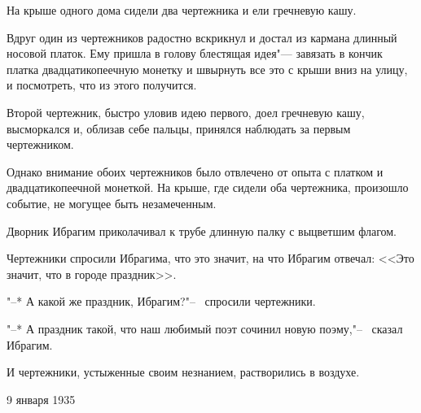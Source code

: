 На крыше одного дома сидели два чертежника и ели гречневую кашу.

Вдруг один из чертежников радостно вскрикнул и достал из кармана длинный носовой платок. Ему пришла в голову блестящая идея"--- завязать в кончик платка двадцатикопеечную монетку и швырнуть все это с крыши вниз на улицу, и посмотреть, что из этого получится.

Второй чертежник, быстро уловив идею первого, доел гречневую кашу, высморкался и, облизав себе пальцы, принялся наблюдать за первым чертежником.

Однако внимание обоих чертежников было отвлечено от опыта с платком и двадцатикопеечной монеткой. На крыше, где сидели оба чертежника, произошло событие, не могущее быть незамеченным.

Дворник Ибрагим приколачивал к трубе длинную палку с выцветшим флагом.

Чертежники спросили Ибрагима, что это значит, на что Ибрагим отвечал: <<Это значит, что в городе праздник>>. 

"--* А какой же праздник, Ибрагим?"--~ спросили чертежники.

"--* А праздник такой, что наш любимый поэт сочинил новую поэму,"--~ сказал Ибрагим.

И чертежники, устыженные своим незнанием, растворились в воздухе.

\begin{flushright}
9 января 1935
\end{flushright}